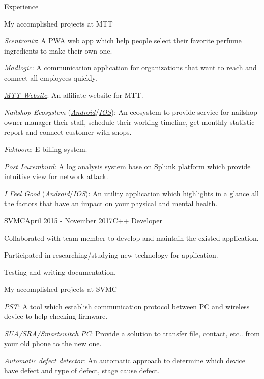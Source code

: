 \documentclass{resume}
\begin{document}
\begin{rSection}{Experience}
    \vspace{-0.5cm}\begin{rSubsection}{}{}{My accomplished projects at MTT}{}
      \item \href{https://app.scnt.me/}{\emph{Scentronix}}: A PWA web app which help people select their favorite perfume ingredients to make their own one.
      \item \href{https://www.madlogic.nl/magic/}{\emph{Madlogic}}: A communication application for organizations that want to reach and connect all employees quickly.
      \item \href{https://mttjsc.com/}{\emph{MTT Website}}: An affiliate website for MTT.
      \item \emph{Nailshop Ecosystem} (\href{https://play.google.com/store/apps/developer?id=MTT+Software+Company+LTD/}{\emph{Android}}/\href{https://apps.apple.com/us/developer/mttjsc/id1250334932}{\emph{IOS}}): 
      An ecosystem to provide service for nailshop owner manager their
      staff, schedule their working timeline, get monthly statistic report and connect customer with shops.
      \item \href{http://app.faktoora.com}{\emph{Faktoora}}: E-billing system.
      \item \emph{Post Luxemburd}: A log analysis system base on Splunk platform which provide intuitive view for network attack.
      \item \emph{I Feel Good} (\href{https://play.google.com/store/apps/details?id=com.ifg_mobile}{\emph{Android}}/\href{}{\emph{IOS}}): 
      An utility application which highlights in a glance all the factors that have an impact on your physical and mental health.
    \end{rSubsection}
  
    \vspace{0.8cm}\begin{rSubsection}{SVMC}{April 2015 - November 2017}{C++ Developer}{}
      \item Collaborated with team member to develop and maintain the existed application.
      \item Participated in researching/studying new technology for application.
      \item Testing and writing documentation.
    \end{rSubsection}

    \begin{rSubsection}{}{}{My accomplished projects at SVMC}{}
      \item \emph{PST}: A tool which establish communication protocol between PC and wireless device to help checking firmware.
      \item \emph{SUA/SRA/Smartswitch PC}: Provide a solution to transfer file, contact, etc.. from your old phone to the new one.
      \item \emph{Automatic defect detector}: An automatic approach to determine which device have defect and type of defect, stage cause defect.
    \end{rSubsection}
  
  \end{rSection}
\end{document}
